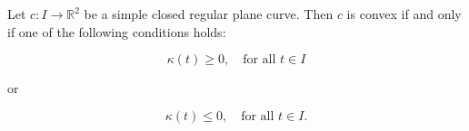Let $c: I \to \mathbb{R}^2$ be a simple closed regular plane curve. Then $c$ is convex if and only if one of the following conditions holds:

$$\kappa(t) \geq 0, \quad \text{for all } t \in I$$

or

$$\kappa(t) \leq 0, \quad \text{for all } t \in I.$$
